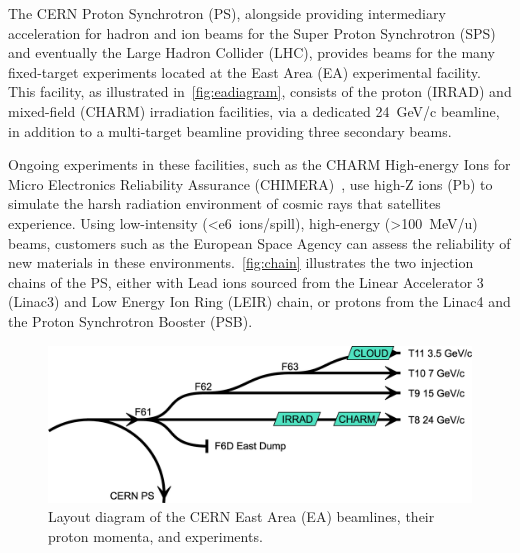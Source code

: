 \documentclass[a4paper,twoside,11pt]{report}
\begin{document}
The CERN Proton Synchrotron (PS), alongside providing intermediary acceleration for hadron and ion beams for the Super Proton Synchrotron (SPS) and eventually the Large Hadron Collider (LHC), provides beams for the many fixed-target experiments located at the East Area (EA) experimental facility. This facility, as illustrated in~\autoref{fig:eadiagram}, consists of the proton (IRRAD) and mixed-field (CHARM) irradiation facilities, via a dedicated \qty{24}{GeV/c} beamline, in addition to a multi-target beamline providing three secondary beams.

Ongoing experiments in these facilities, such as the CHARM High-energy Ions for Micro Electronics Reliability Assurance (CHIMERA)~\cite{Fraser:feasibility}, use high-Z ions (Pb) to simulate the harsh radiation environment of cosmic rays that satellites experience. Using low-intensity (\qty{<e6}{ions/spill}), high-energy (\qty{>100}{\MeV / u}) beams, customers such as the European Space Agency can assess the reliability of new materials in these environments.~\autoref{fig:chain} illustrates the two injection chains of the PS, either with Lead ions sourced from the Linear Accelerator 3 (Linac3) and Low Energy Ion Ring (LEIR) chain, or protons from the Linac4 and the Proton Synchrotron Booster (PSB).

\begin{figure}
  \centering
  \includegraphics[width=\linewidth]{east-area.png}
  \caption[Layout of the CERN East Area beamlines]{Layout diagram of the CERN East Area (EA) beamlines, their proton momenta, and experiments.}\label{fig:eadiagram}
\end{figure}
\end{document}
